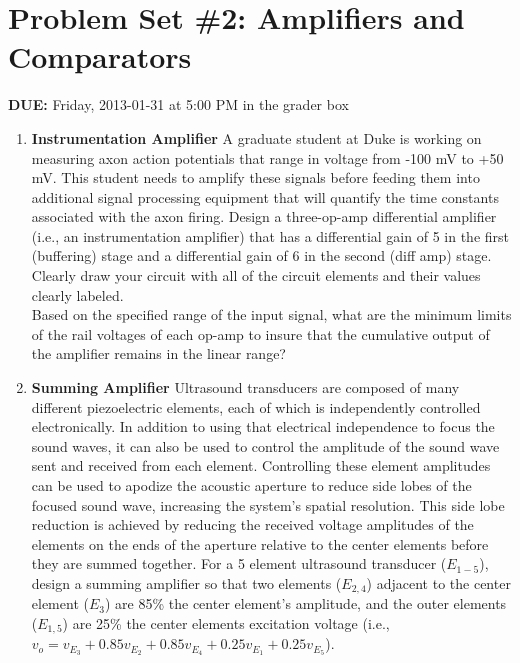 


\section*{Problem Set \#2: Amplifiers and Comparators}

\textbf{DUE:} Friday, 2013-01-31 at 5:00 PM in the grader box

\begin{enumerate}

\item {\bf Instrumentation Amplifier} A graduate student at Duke is working on
    measuring axon action potentials that range in voltage from -100 mV to +50
    mV.  This student needs to amplify these signals before feeding them into
    additional signal processing equipment that will quantify the time
    constants associated with the axon firing.  Design a three-op-amp
    differential amplifier (i.e., an instrumentation amplifier) that has a
    differential gain of 5 in the first (buffering) stage and a differential
    gain of 6 in the second (diff amp) stage.  Clearly draw your circuit with
    all of the circuit elements and their values clearly labeled. \\

    Based on the specified range of the input signal, what are the minimum
    limits of the rail voltages of each op-amp to insure that the cumulative
    output of the amplifier remains in the linear range?\\

\item {\bf Summing Amplifier} Ultrasound transducers are composed of many
    different piezoelectric elements, each of which is independently controlled
    electronically.  In addition to using that electrical independence to focus
    the sound waves, it can also be used to control the amplitude of the sound
    wave sent and received from each element.  Controlling these element
    amplitudes can be used to apodize the acoustic aperture to reduce side
    lobes of the focused sound wave, increasing the system's spatial
    resolution.  This side lobe reduction is achieved by reducing the received
    voltage amplitudes of the elements on the ends of the aperture relative to
    the center elements before they are summed together.  For a 5 element
    ultrasound transducer ($E_{1-5}$), design a summing amplifier so that two
    elements ($E_{2,4}$) adjacent to the center element ($E_3$) are 85\% the
    center element's amplitude, and the outer elements ($E_{1,5}$) are 25\% the
    center elements excitation voltage (i.e., $v_o = v_{E_3} + 0.85 v_{E_2} +
    0.85 v_{E_4} + 0.25 v_{E_1} + 0.25 v_{E_5}$).\\


\end{enumerate}
